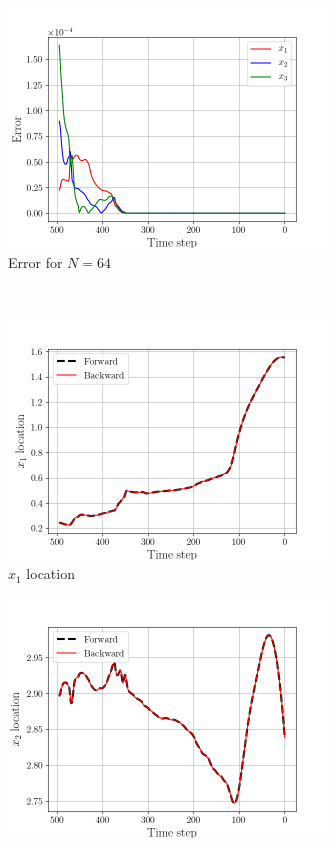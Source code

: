 \begin{figure}[H]
    \begin{subfigure}[H]{0.45\textwidth}
        \includegraphics[height=2.5in]{media/rk4/DS-N-64/error-64.png}
        \caption{Error for $N=64$}
    \end{subfigure}
    ~
    \begin{subfigure}[H]{0.45\textwidth}
        \includegraphics[height=2.5in]{media/rk4/DS-N-64/x1-location.png}
        \caption{$x_{1}$ location}
    \end{subfigure}
    \newline
    \begin{subfigure}[H]{0.45\textwidth}
        \includegraphics[height=2.5in]{media/rk4/DS-N-64/x2-location.png}

\end{subfigure}
\end{figure}

